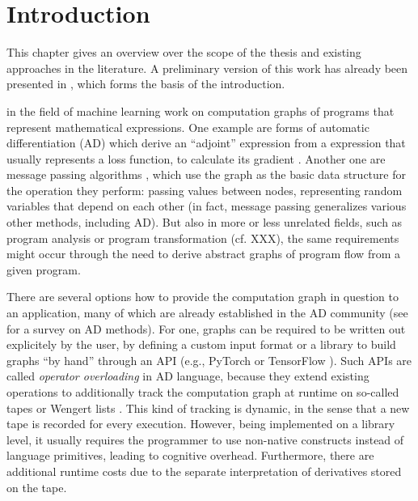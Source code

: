 \chapter{Introduction}
\label{cha:introduction}

This chapter gives an overview over the scope of the thesis and existing approaches in the
literature.  A preliminary version of this work has already been presented in
\textcite{gabler2019graph}, which forms the basis of the introduction.

 in the field of machine learning work on computation graphs of programs
that represent mathematical expressions.  One example are forms of automatic differentiation (AD)
which derive an \enquote{adjoint} expression from a expression that usually represents a loss
function, to calculate its gradient \parencite{griewank2008evaluating, gebremedhin2020introduction}.
Another one are message passing algorithms \parencite{minka2005divergence}, which use the graph as
the basic data structure for the operation they perform: passing values between nodes, representing
random variables that depend on each other (in fact, message passing generalizes various other
methods, including AD).  But also in more or less unrelated fields, such as program analysis or
program transformation (cf. XXX), the same requirements might occur through the need
to derive abstract graphs of program flow from a given program.

There are several options how to provide the computation graph in question to an application, many
of which are already established in the AD community (see \textcite{baydin2018automatic} for a
survey on AD methods).  For one, graphs can be required to be written out explicitely by the user,
by defining a custom input format or a library to build graphs \enquote{by hand}
through an API (e.g., PyTorch \parencite{paszke2017automatic} or TensorFlow
\parencite{abadi2015tensorflow}).  Such APIs are called \emph{operator overloading} in AD language,
because they extend existing operations to additionally track the computation graph at runtime on
so-called tapes or Wengert lists \parencite{bartholomew-biggs2000automatic}.  This kind of tracking
is dynamic, in the sense that a new tape is recorded for every execution.  However, being
implemented on a library level, it usually requires the programmer to use non-native constructs
instead of language primitives, leading to cognitive overhead. Furthermore, there are additional
runtime costs due to the separate interpretation of derivatives stored on the tape.

